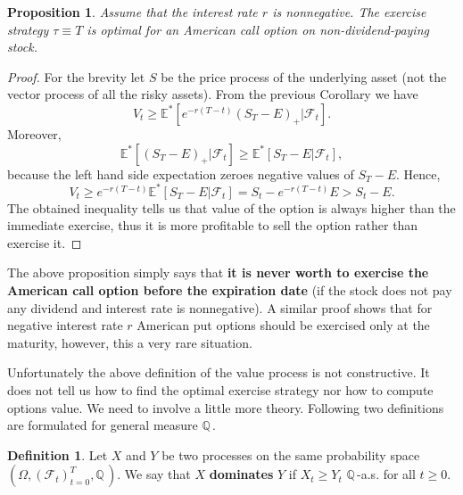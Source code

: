 \documentclass[a4paper,11pt, twoside]{book}
\newtheorem{prop}[thm]{Proposition}
\theoremstyle{definition}
\newtheorem{mydef}{Definition}[chapter]
\theoremstyle{remark}
\def\Q{{\mathbb{Q}}\,}
\def\Em{{\mathbb{E}^*}}
\begin{document}
\begin{prop}
 Assume that the interest rate $r$ is nonnegative. The exercise strategy $\tau \equiv T$ is optimal for an American call option on non-dividend-paying stock.
\end{prop}
\begin{proof}
 For the brevity let $S$ be the price process of the underlying asset (not the vector process of all the risky assets). From the previous Corollary we have
 \[V_t \geq \Em[e^{-r(T-t)}(S_T - E)_+ | \mathcal{F}_t].\] Moreover,
 \[\Em[(S_T - E)_+ | \mathcal{F}_t] \geq \Em[S_T - E | \mathcal{F}_t],\]
 because the left hand side expectation zeroes negative values of $S_T - E$. Hence,
 \[ V_t \geq e^{-r(T-t)}\Em[S_T - E | \mathcal{F}_t] = S_t - e^{-r(T-t)}E > S_t - E.\]
 The obtained inequality tells us that value of the option is always higher than the immediate exercise, thus it is more profitable to sell the option rather than exercise it.
\end{proof}
The above proposition simply says that \textbf{it is never worth to exercise the American call option before the expiration date} (if the stock does not pay any dividend and interest rate is nonnegative). A similar proof shows that for negative interest rate $r$ American put options should be exercised only at the maturity, however, this a very rare situation.

Unfortunately the above definition of the value process is not constructive. It does not tell us how to find the optimal exercise strategy nor how to compute options value. We need to involve a little more theory. Following two definitions are formulated for general measure $\Q$. 

\begin{mydef}
 Let $X$ and $Y$ be two processes on the same probability space $(\Omega, (\mathcal{F}_t)_{t=0}^T, \Q)$. We say that $X$ \textbf{dominates} $Y$ if $ X_t \geq Y_t$ $\Q$-a.s. for all $t \geq 0$.
\end{mydef}
 
\end{document}
